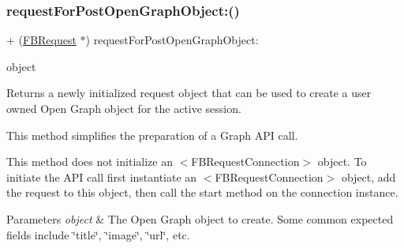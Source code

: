 \subsubsection{\texorpdfstring{request\+For\+Post\+Open\+Graph\+Object\+:()}{requestForPostOpenGraphObject:()}\hspace{0.1cm}{\footnotesize\ttfamily [5/5]}}
{\footnotesize\ttfamily + (\hyperlink{interfaceFBRequest}{F\+B\+Request} $\ast$) request\+For\+Post\+Open\+Graph\+Object\+: \begin{DoxyParamCaption}\item[{(id$<$ \hyperlink{protocolFBOpenGraphObject-p}{F\+B\+Open\+Graph\+Object} $>$)}]{object }\end{DoxyParamCaption}}

Returns a newly initialized request object that can be used to create a user owned Open Graph object for the active session.

This method simplifies the preparation of a Graph A\+PI call.

This method does not initialize an $<$\+F\+B\+Request\+Connection$>$ object. To initiate the A\+PI call first instantiate an $<$\+F\+B\+Request\+Connection$>$ object, add the request to this object, then call the {\ttfamily start} method on the connection instance.


\begin{DoxyParams}{Parameters}
{\em object} & The Open Graph object to create. Some common expected fields include \char`\"{}title\char`\"{}, \char`\"{}image\char`\"{}, \char`\"{}url\char`\"{}, etc. \\
\hline
\end{DoxyParams}
\mbox{\label{interfaceFBRequest_aa5c66ef020233f0de4a26473a8b7c87b}} 
